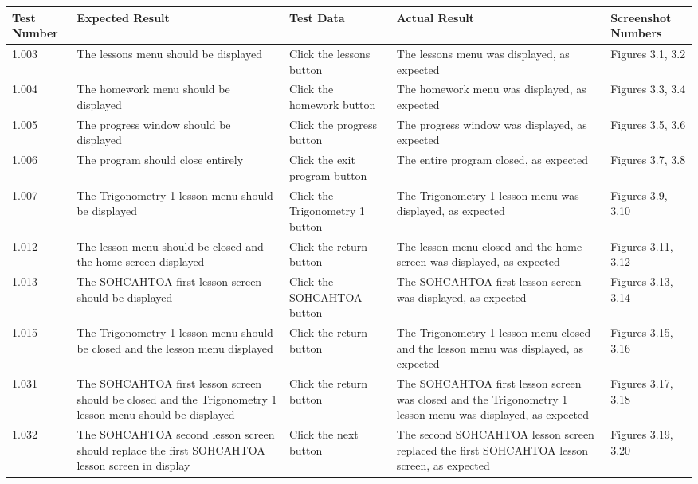 \begin{landscape}
\begin{center}
\begin{longtable}{|p{2.5cm}|p{4cm}|p{4cm}|p{4.5cm}|p{3cm}|} \hline
\textbf{Test Number} & \textbf{Expected Result} & \textbf{Test Data} & \textbf{Actual Result} & \textbf{Screenshot Numbers} \\ \hline
1.003 & The lessons menu should be displayed & Click the lessons button & The lessons menu was displayed, as expected & Figures 3.1, 3.2 \\ \hline
1.004 & The homework menu should be displayed & Click the homework button & The homework menu was displayed, as expected & Figures 3.3, 3.4 \\ \hline
1.005 & The progress window should be displayed & Click the progress button & The progress window was displayed, as expected & Figures 3.5, 3.6 \\ \hline
1.006 & The program should close entirely & Click the exit program button & The entire program closed, as expected & Figures 3.7, 3.8 \\ \hline
1.007 & The Trigonometry 1 lesson menu should be displayed & Click the Trigonometry 1 button & The Trigonometry 1 lesson menu was displayed, as expected & Figures 3.9, 3.10 \\ \hline
1.012 & The lesson menu should be closed and the home screen displayed & Click the return button & The lesson menu closed and the home screen was displayed, as expected & Figures 3.11, 3.12 \\ \hline
1.013 & The SOHCAHTOA first lesson screen should be displayed & Click the SOHCAHTOA button & The SOHCAHTOA first lesson screen was displayed, as expected & Figures 3.13, 3.14 \\ \hline
1.015 & The Trigonometry 1 lesson menu should be closed and the lesson menu displayed & Click the return button & The Trigonometry 1 lesson menu closed and the lesson menu was displayed, as expected & Figures 3.15, 3.16 \\ \hline
1.031 & The SOHCAHTOA first lesson screen should be closed and the Trigonometry 1 lesson menu should be displayed & Click the return button & The SOHCAHTOA first lesson screen was closed and the Trigonometry 1 lesson menu was displayed, as expected & Figures 3.17, 3.18 \\ \hline
1.032 & The SOHCAHTOA second lesson screen should replace the first SOHCAHTOA lesson screen in display & Click the next button & The second SOHCAHTOA lesson screen replaced the first SOHCAHTOA lesson screen, as expected & Figures 3.19, 3.20 \\ \hline

\end{longtable}
\end{center}
\end{landscape}
